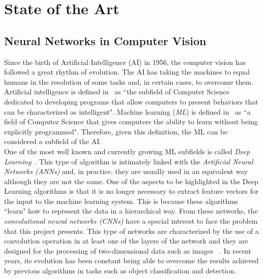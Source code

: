 \chapter{State of the Art}\label{cap.estadodelarte}
\setlength{\parindent}{0pt}
\section{Neural Networks in Computer Vision}
Since the birth of Artificial Intelligence (AI) in 1956, the computer vision has followed a great rhythm of evolution. The AI has taking the machines to equal humans in the resolution of some tasks and, in certain cases, to overcome them.
Artificial intelligence is defined in~\cite{mccarthy2006proposal} as ``the subfield of Computer Science dedicated to developing programs that allow computers to present behaviors that can be characterized as intelligent". Machine learning (\textit{ML}) is defined in~\cite{samuel2000some} as ``a field of Computer Science that gives computers the ability to learn without being explicitly programmed". Therefore, given this definition, the ML can be considered a subfield of the AI.\\
One of the most well known and currently growing ML subfields is called \textit{Deep Learning}~\cite{deng2014deep}. This type of algorithm is intimately linked with the \textit{Artificial Neural Networks (ANNs)} and, in practice, they are usually used in an equivalent way although they are not the same. One of the aspects to be highlighted in the Deep Learning algorithms is that it is no longer necessary to extract feature vectors for the input to the machine learning system. This is because these algorithms ``learn" how to represent the data in a hierarchical way. From these networks, the \textit{convolutional neural networks (CNNs)} have a special interest to face the problem that this project presents. This type of networks are characterized by the use of a convolution operation in at least one of the layers of the network and they are designed for the processing of two-dimensional data such as images ~\cite{liu2015implementation}. In recent years, its evolution has been constant being able to overcome the results achieved by previous algorithms in tasks such as object classification and detection.\\

